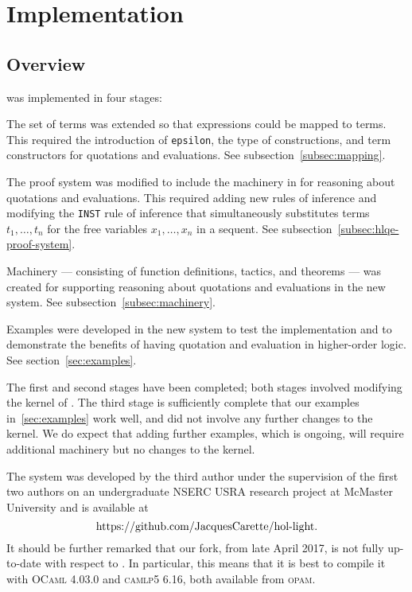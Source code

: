\documentclass[fleqn]{llncs}
\begin{document}
\section{Implementation}\label{sec:implementation}

\subsection{Overview}

{\HLQE} was implemented in four stages:

\be

  \item The set of terms was extended so that {\churchqe}
    expressions could be mapped to {\HL} terms.  This required the
    introduction of \texttt{epsilon}, the type of constructions, and
    term constructors for quotations and evaluations.  See
    subsection~\ref{subsec:mapping}.

  \item The proof system was modified to include the machinery
    in {\churchqe} for reasoning about quotations and evaluations.
    This required adding new rules of inference and modifying
    the \texttt{INST} rule of inference that simultaneously
    substitutes terms $t_1,\ldots,t_n$ for the free variables
    $x_1,\ldots,x_n$ in a sequent.  See
    subsection~\ref{subsec:hlqe-proof-system}.

  \item Machinery --- consisting of {\HOL} function definitions,
    tactics, and theorems --- was created for supporting reasoning
    about quotations and evaluations in the new system.  See
    subsection~\ref{subsec:machinery}.

  \item Examples were developed in the new system to test the
    implementation and to demonstrate the benefits of having quotation
    and evaluation in higher-order logic.  See section~\ref{sec:examples}.

\ee

\noindent
The first and second stages have been completed; both stages involved
modifying the kernel of {\HL}.  The third stage is sufficiently
complete that our examples in~\ref{sec:examples} work well, and did
not involve any further changes to the {\HL} kernel.  We do expect
that adding further examples, which is ongoing, will require
additional machinery but no changes to the kernel.

The {\HLQE} system was developed by the third author under the
supervision of the first two authors on an undergraduate NSERC USRA
research project at McMaster University and is available at
\[\mbox{https://github.com/JacquesCarette/hol-light}.\]
It should be further remarked that our fork, from late April 2017, is not fully
up-to-date with respect to {\HL}. In particular, this means that it is best to
compile it with \textsc{OCaml 4.03.0} and \textsc{camlp5 6.16},
both available from \textsc{opam}.
\end{document}
